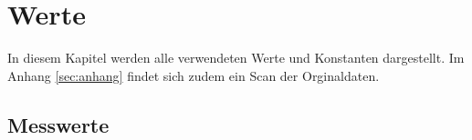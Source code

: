 \section{Werte}
\label{sec:werte}
In diesem Kapitel werden alle verwendeten Werte und Konstanten dargestellt. Im  Anhang \autoref{sec:anhang}
findet sich zudem ein Scan der Orginaldaten.
\subsection{Messwerte}
